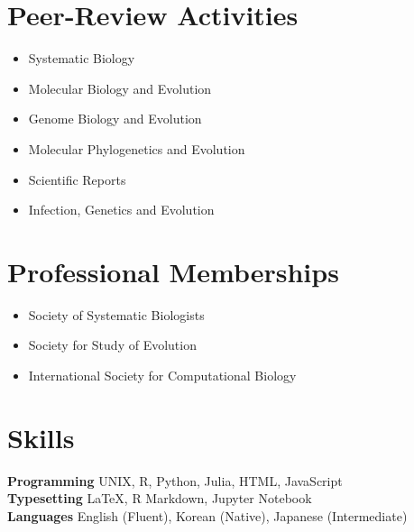 \documentclass[11pt,letterpaper,sans]{moderncv} %
\begin{document}
\section{Peer-Review Activities}%
\begin{itemize}
	\item Systematic Biology
	\item Molecular Biology and Evolution
	\item Genome Biology and Evolution
	\item Molecular Phylogenetics and Evolution
	\item Scientific Reports
	\item Infection, Genetics and Evolution
\end{itemize}

\section{Professional Memberships}%
\begin{itemize}
	\item Society of Systematic Biologists
	\item Society for Study of Evolution
	\item International Society for Computational Biology
\end{itemize}

\section{Skills}%
\textbf{Programming} UNIX, R, Python, Julia, HTML, JavaScript\\
\textbf{Typesetting} {\LaTeX}, R Markdown, Jupyter Notebook\\
\textbf{Languages} English (Fluent), Korean (Native), Japanese (Intermediate)

\pagebreak
\end{document}
